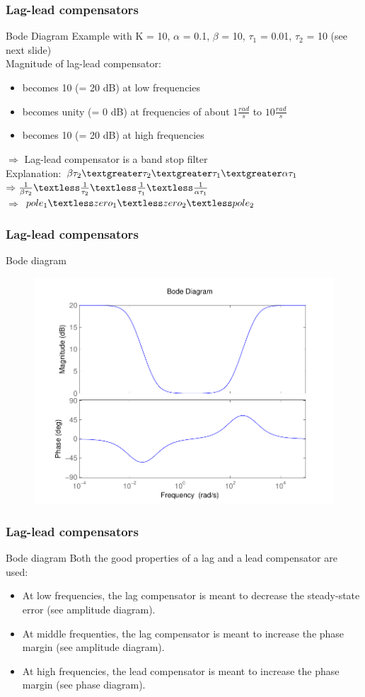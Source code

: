 \begin{frame}
\frametitle{Lag-lead compensators}
\begin{block}{Bode Diagram}
Example with K = 10, $\alpha$ = 0.1, $\beta$ = 10, $\tau_1$ = 0.01, $\tau_2$ = 10 (see next slide) \\
Magnitude of lag-lead compensator:
\begin{itemize}
\item becomes 10 (= 20 dB) at low frequencies
\item becomes unity (= 0 dB) at frequencies of about $1 \frac{rad}{s}$ to $10 \frac{rad}{s}$
\item becomes 10 (= 20 dB) at high frequencies
\end{itemize}
$\Rightarrow$ Lag-lead compensator is a band stop filter \\
Explanation: $\beta \tau_2 \textgreater \tau_2 \textgreater \tau_1 \textgreater \alpha \tau_1$ \\
$\Rightarrow \frac{1}{\beta \tau_2} \textless \frac{1}{\tau_2} \textless \frac{1}{\tau_1} \textless \frac{1}{\alpha \tau_1}$ \\
$\Rightarrow$ $pole_1 \textless zero_1 \textless zero_2 \textless pole_2$
\end{block}
\end{frame}

\begin{frame}
\frametitle{Lag-lead compensators}
\begin{block}{Bode diagram}
\begin{figure}
	\centering
	\includegraphics[width=0.5
	\linewidth]{laglead}
\end{figure}	
\end{block}
\end{frame}

\begin{frame}
\frametitle{Lag-lead compensators}	\begin{block}{Bode diagram}
	Both the good properties of a lag and a lead compensator are used:
	\begin{itemize}
	\item At low frequencies, the lag compensator is meant to decrease the steady-state error (see amplitude diagram).
	\item At middle frequenties, the lag compensator is meant to increase the phase margin (see amplitude diagram).
	\item At high frequencies, the lead compensator is meant to increase the phase margin (see phase diagram). 
	\end{itemize}
\end{block}
\end{frame}

